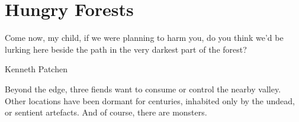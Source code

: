 \chapter{Hungry Forests}
\epigraph{Come now, my child, if we were planning to harm you, do you think we'd be lurking here beside the path in the very darkest part of the forest?}{Kenneth Patchen}

\label{forestChapter}

\noindent
Beyond the \gls{edge}, three \glspl{fiend} want to consume or control the nearby \gls{valley}.
Other locations have been dormant for centuries, inhabited only by the undead, or sentient \glspl{artefact}.
And of course, there are \glspl{monster}.%

\label{sqList:Forest}

